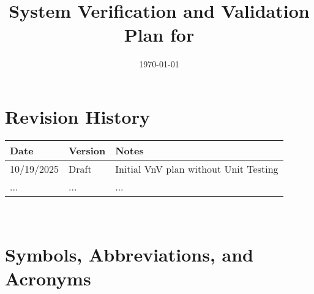 \documentclass[12pt, titlepage]{article}
\begin{document}
\title{System Verification and Validation Plan for \progname{}} 
\author{\authname}
\date{\today}
	
\maketitle


\section*{Revision History}

\begin{tabularx}{\textwidth}{p{3cm}p{2cm}X}
\toprule {\bf Date} & {\bf Version} & {\bf Notes}\\
\midrule
10/19/2025 & Draft & Initial VnV plan without Unit Testing\\
... & ... & ...\\
\bottomrule
\end{tabularx}

~\\

\newpage

\tableofcontents

\listoftables


\listoffigures


\newpage



\hypertarget{glossary-catan}{}
\hypertarget{glossary-ai}{}
\hypertarget{glossary-rl}{}
\hypertarget{glossary-dt}{}
\hypertarget{glossary-cv}{}
\hypertarget{glossary-llm}{}
\hypertarget{glossary-gamestate}{}
\hypertarget{glossary-nfr}{}
\hypertarget{glossary-fr}{}

\newcommand{\Catan}{\hyperlink{glossary-catan}{Catan}}
\newcommand{\AI}{\hyperlink{glossary-ai}{AI}}
\newcommand{\RL}{\hyperlink{glossary-rl}{RL}}
\newcommand{\DigitalTwin}{\hyperlink{glossary-dt}{Digital Twin}}
\newcommand{\CV}{\hyperlink{glossary-cv}{CV}}
\newcommand{\LLM}{\hyperlink{glossary-llm}{LLM}}
\newcommand{\GameState}{\hyperlink{glossary-gamestate}{Game State}}
\newcommand{\NFR}{\hyperlink{glossary-nfr}{NFR}}
\newcommand{\FR}{\hyperlink{glossary-fr}{FR}}

\section{Symbols, Abbreviations, and Acronyms}
\end{document}
